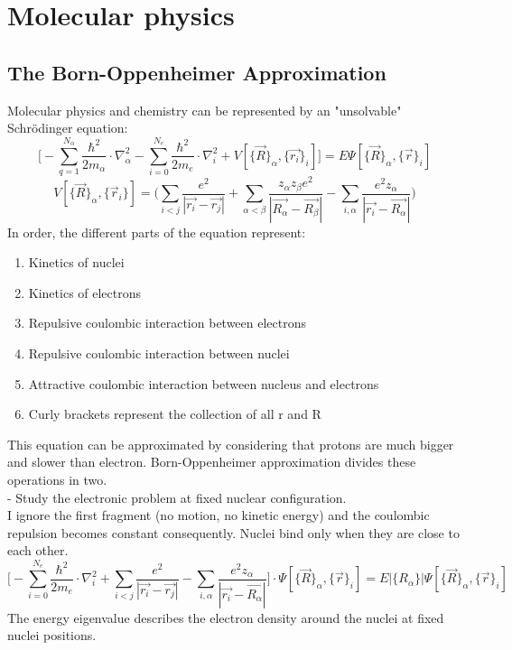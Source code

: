 \graphicspath{{chapters/07}}
\chapter{Molecular physics}
\section{The Born-Oppenheimer Approximation}
Molecular physics and chemistry can be represented by an "unsolvable" Schr\"odinger equation:\\
\[
\bigg[-\sum_{q=1}^{N_{\alpha}}\frac{\hbar^2}{2m_{\alpha}}\cdot\nabla_{\alpha}^2
-\sum_{i=0}^{N_e}\frac{\hbar^2}{2m_e}\cdot\nabla^2_i
+V[\{\vec{R}\}_{\alpha},\{\vec{r_i}\}_i]\bigg]=E\Psi[\{\vec{R}\}_{\alpha},\{\vec{r}\}_i]
\]
\[
V[\{\vec{R}\}_{\alpha},\{\vec{r}_i\}]=\bigg(\sum_{i<j}\frac{e^2}{|\vec{r_i}-\vec{r_j}|}
+\sum_{\alpha<\beta}\frac{z_{\alpha}z_{\beta}e^2}{|\vec{R_{\alpha}}-\vec{R_{\beta}}|}
-\sum_{i,\alpha}\frac{e^2z_{\alpha}}{|\vec{r_i}-\vec{R_{\alpha}}|}\bigg)\]
In order, the different parts of the equation represent:
\begin{enumerate}
	\item Kinetics of nuclei
	\item Kinetics of electrons
	\item Repulsive coulombic interaction between electrons
	\item Repulsive coulombic interaction between nuclei
	\item Attractive coulombic interaction between nucleus and electrons
	\item Curly brackets represent the collection of all r and R
\end{enumerate}
This equation can be approximated by considering that protons are much bigger and slower than electron. Born-Oppenheimer approximation divides these operations in two.\\
 - Study the electronic problem at fixed nuclear configuration.\\
I ignore the first fragment (no motion, no kinetic energy) and the coulombic repulsion becomes constant consequently. Nuclei bind only when they are close to each other.
\[
\bigg[-\sum_{i=0}^{N_e}\frac{\hbar^2}{2m_e}\cdot\nabla^2_i
+\sum_{i<j}\frac{e^2}{|\vec{r_i}-\vec{r_j}|}
-\sum_{i,\alpha}\frac{e^2z_{\alpha}}{|\vec{r_i}-\vec{R_{\alpha}}|}\bigg]\cdot\Psi[\{\vec{R}\}_{\alpha},\{\vec{r}\}_i] =E|\{R_{\alpha}\}|\Psi[\{\vec{R}\}_{\alpha},\{\vec{r}\}_i]
\]
The energy eigenvalue describes the electron density around the nuclei at fixed nuclei positions.\\
